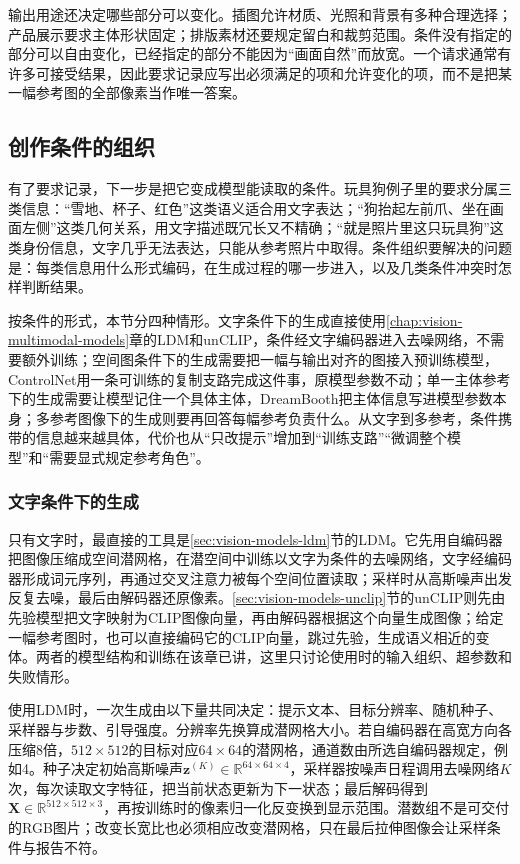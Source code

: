 输出用途还决定哪些部分可以变化。插图允许材质、光照和背景有多种合理选择；产品展示要求主体形状固定；排版素材还要规定留白和裁剪范围。条件没有指定的部分可以自由变化，已经指定的部分不能因为“画面自然”而放宽。一个请求通常有许多可接受结果，因此要求记录应写出必须满足的项和允许变化的项，而不是把某一幅参考图的全部像素当作唯一答案。

\subsection{创作条件的组织}
\label{sec:vision-generation-conditions}

有了要求记录，下一步是把它变成模型能读取的条件。玩具狗例子里的要求分属三类信息：“雪地、杯子、红色”这类语义适合用文字表达；“狗抬起左前爪、坐在画面左侧”这类几何关系，用文字描述既冗长又不精确；“就是照片里这只玩具狗”这类身份信息，文字几乎无法表达，只能从参考照片中取得。条件组织要解决的问题是：每类信息用什么形式编码，在生成过程的哪一步进入，以及几类条件冲突时怎样判断结果。

按条件的形式，本节分四种情形。文字条件下的生成直接使用\ref{chap:vision-multimodal-models}章的LDM和unCLIP，条件经文字编码器进入去噪网络，不需要额外训练；空间图条件下的生成需要把一幅与输出对齐的图接入预训练模型，ControlNet用一条可训练的复制支路完成这件事，原模型参数不动；单一主体参考下的生成需要让模型记住一个具体主体，DreamBooth把主体信息写进模型参数本身；多参考图像下的生成则要再回答每幅参考负责什么。从文字到多参考，条件携带的信息越来越具体，代价也从“只改提示”增加到“训练支路”“微调整个模型”和“需要显式规定参考角色”。

\subsubsection{文字条件下的生成}
\label{sec:vision-generation-latent-entry}

只有文字时，最直接的工具是\ref{sec:vision-models-ldm}节的LDM。它先用自编码器把图像压缩成空间潜网格，在潜空间中训练以文字为条件的去噪网络，文字经编码器形成词元序列，再通过交叉注意力被每个空间位置读取；采样时从高斯噪声出发反复去噪，最后由解码器还原像素。\ref{sec:vision-models-unclip}节的unCLIP则先由先验模型把文字映射为CLIP图像向量，再由解码器根据这个向量生成图像；给定一幅参考图时，也可以直接编码它的CLIP向量，跳过先验，生成语义相近的变体。两者的模型结构和训练在该章已讲，这里只讨论使用时的输入组织、超参数和失败情形。

使用LDM时，一次生成由以下量共同决定：提示文本、目标分辨率、随机种子、采样器与步数、引导强度。分辨率先换算成潜网格大小。若自编码器在高宽方向各压缩8倍，$512\times512$的目标对应$64\times64$的潜网格，通道数由所选自编码器规定，例如4。种子决定初始高斯噪声$\bm{z}^{(K)}\in\mathbb{R}^{64\times64\times4}$，采样器按噪声日程调用去噪网络$K$次，每次读取文字特征，把当前状态更新为下一状态；最后解码得到$\bm{X}\in\mathbb{R}^{512\times512\times3}$，再按训练时的像素归一化反变换到显示范围。潜数组不是可交付的RGB图片；改变长宽比也必须相应改变潜网格，只在最后拉伸图像会让采样条件与报告不符。

